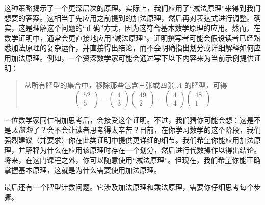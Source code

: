 \begin{example}[最多两张 $A$]
    这种策略揭示了一个更深层次的原理。实际上，我们应用了``减法原理''来得到我们想要的答案。这相当于先应用之前提到的加法原理，然后再对表达式进行调整。确实，这是理解这个问题的``正确''方式，因为这符合基本数学原理的应用。然而，在数学证明中，通常会更直接地应用``减法原理''。证明撰写者可能会假设读者已经熟悉加法原理的复杂运作，并直接得出结论，而不会明确指出划分或详细解释如何应用加法原理。例如，一个资深数学家可能会通过写下以下内容来为当前示例提供证明：
    \begin{quotation}
        从所有牌型的集合中，移除那些包含三张或四张 $A$ 的牌型，可得
        \[\begin{pmatrix}
                52 \\
                5
            \end{pmatrix}-\begin{pmatrix}
                4 \\
                3
            \end{pmatrix}\begin{pmatrix}
                49 \\
                2
            \end{pmatrix}-\begin{pmatrix}
                4 \\
                4
            \end{pmatrix}\begin{pmatrix}
                48 \\
                1
            \end{pmatrix}\]
    \end{quotation}
    一位数学家同仁稍加思考后，会接受这个证明。不过，我们猜你可能会想：这是不是\emph{太简短}了？会不会让读者思考得太辛苦？目前，在你学习数学的这个阶段，我们强烈建议（并要求）你在此类证明中提供更详细的细节。我们希望你能应用加法原理，并解释为什么在应用该原理时存在一个划分，然后进行代数操作以得出结论。将来，在这门课程之外，你可以随意使用``减法原理''。但现在，我们希望你能正确掌握基本原理，这就是为什么需要使用加法原理。

    最后还有一个牌型计数问题。它涉及加法原理和乘法原理，需要你仔细思考每个步骤。
\end{example}


